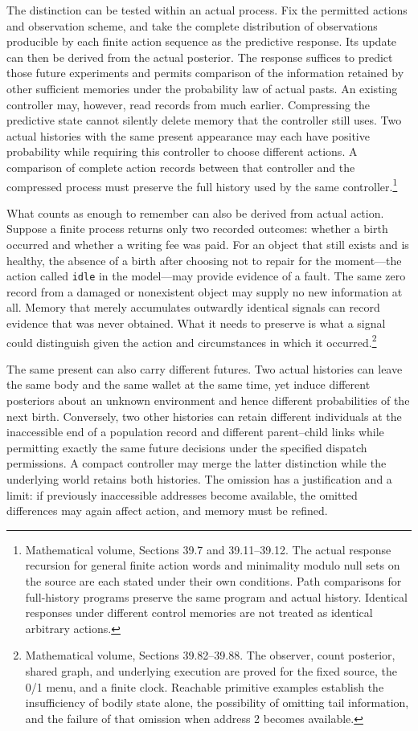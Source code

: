 \documentclass[
  english,
  11pt,
  oneside]{book}
\newcounter{none} %
\begin{document}
The distinction can be tested within an actual process. Fix the permitted actions and observation scheme, and take the complete distribution of observations producible by each finite action sequence as the predictive response. Its update can then be derived from the actual posterior. The response suffices to predict those future experiments and permits comparison of the information retained by other sufficient memories under the probability law of actual pasts. An existing controller may, however, read records from much earlier. Compressing the predictive state cannot silently delete memory that the controller still uses. Two actual histories with the same present appearance may each have positive probability while requiring this controller to choose different actions. A comparison of complete action records between that controller and the compressed process must preserve the full history used by the same controller.\footnote{\hypertarget{ph-note-21}{}Mathematical volume, Sections 39.7 and 39.11--39.12. The actual response recursion for general finite action words and minimality modulo null sets on the source are each stated under their own conditions. Path comparisons for full-history programs preserve the same program and actual history. Identical responses under different control memories are not treated as identical arbitrary actions.}

What counts as enough to remember can also be derived from actual action. Suppose a finite process returns only two recorded outcomes: whether a birth occurred and whether a writing fee was paid. For an object that still exists and is healthy, the absence of a birth after choosing not to repair for the moment---the action called \texttt{idle} in the model---may provide evidence of a fault. The same zero record from a damaged or nonexistent object may supply no new information at all. Memory that merely accumulates outwardly identical signals can record evidence that was never obtained. What it needs to preserve is what a signal could distinguish given the action and circumstances in which it occurred.\footnote{\hypertarget{ph-note-22}{}Mathematical volume, Sections 39.82--39.88. The observer, count posterior, shared graph, and underlying execution are proved for the fixed source, the 0/1 menu, and a finite clock. Reachable primitive examples establish the insufficiency of bodily state alone, the possibility of omitting tail information, and the failure of that omission when address 2 becomes available.}

The same present can also carry different futures. Two actual histories can leave the same body and the same wallet at the same time, yet induce different posteriors about an unknown environment and hence different probabilities of the next birth. Conversely, two other histories can retain different individuals at the inaccessible end of a population record and different parent--child links while permitting exactly the same future decisions under the specified dispatch permissions. A compact controller may merge the latter distinction while the underlying world retains both histories. The omission has a justification and a limit: if previously inaccessible addresses become available, the omitted differences may again affect action, and memory must be refined.
\end{document}
